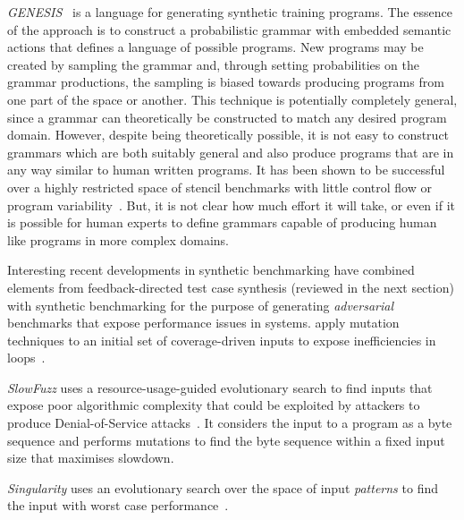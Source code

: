 \emph{GENESIS}~\cite{Chiu2015} is a language for generating synthetic training programs. The essence of the approach is to construct a probabilistic grammar with embedded semantic actions that defines a language of possible programs. New programs may be created by sampling the grammar and, through setting probabilities on the grammar productions, the sampling is biased towards producing programs from one part of the space or another. This technique is potentially completely general, since a grammar can theoretically be constructed to match any desired program domain. However, despite being theoretically possible, it is not easy to construct grammars which are both suitably general and also produce programs that are in any way similar to human written programs. It has been shown to be successful over a highly restricted space of stencil benchmarks with little control flow or program variability~\cite{Garvey2015b,Falch2015,Cummins2015}. But, it is not clear how much effort it will take, or even if it is possible for human experts to define grammars capable of producing human like programs in more complex domains.

Interesting recent developments in synthetic benchmarking have combined elements from feedback-directed test case synthesis (reviewed in the next section) with synthetic benchmarking for the purpose of generating \emph{adversarial} benchmarks that expose performance issues in systems.
\citeauthor{Dhok2016} apply mutation techniques to an initial set of coverage-driven inputs to expose inefficiencies in loops~\cite{Dhok2016}.

\emph{SlowFuzz} uses a resource-usage-guided evolutionary search to find inputs that expose poor algorithmic complexity that could be exploited by attackers to produce Denial-of-Service attacks~\cite{Petsios2017}. It considers the input to a program as a byte sequence and performs mutations to find the byte sequence within a fixed input size that maximises slowdown.

\emph{Singularity} uses an evolutionary search over the space of input \emph{patterns} to find the input with worst case performance~\cite{Wei2018}.

